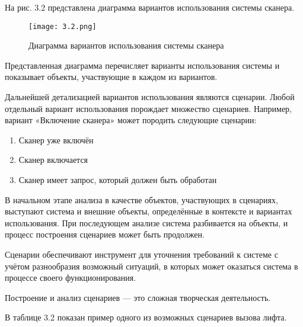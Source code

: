\documentclass[12pt]{article}
\begin{document}
    \newpage

    На рис. 3.2 представлена диаграмма вариантов использования системы сканера.

    \begin{figure}[h]
        \texttt{[image: 3.2.png]}
        \centering
        \caption{Диаграмма вариантов использования системы сканера}
    \end{figure}

    Представленная диаграмма перечисляет варианты использования системы и показывает объекты, участвующие в каждом из вариантов.

    Дальнейшей детализацией вариантов использования являются сценарии. Любой отдельный вариант использования порождает множество сценариев. Например, вариант «Включение сканера» может породить следующие сценарии:

    \begin{enumerate}
        \item Сканер уже включён
        \item Сканер включается
        \item Сканер имеет запрос, который должен быть обработан
    \end{enumerate}
    В начальном этапе анализа в качестве объектов, участвующих в сценариях, выступают система и внешние объекты, определённые в контексте и вариантах использования. При последующем анализе система разбивается на объекты, и процесс построения сценариев может быть продолжен.

    Сценарии обеспечивают инструмент для уточнения требований к системе с учётом разнообразия возможный ситуаций, в которых может оказаться система в процессе своего функционирования.

    Построение и анализ сценариев --- это сложная творческая деятельность.

    \newpage

    В таблице 3.2 показан пример одного из возможных сценариев вызова лифта.
\end{document}
